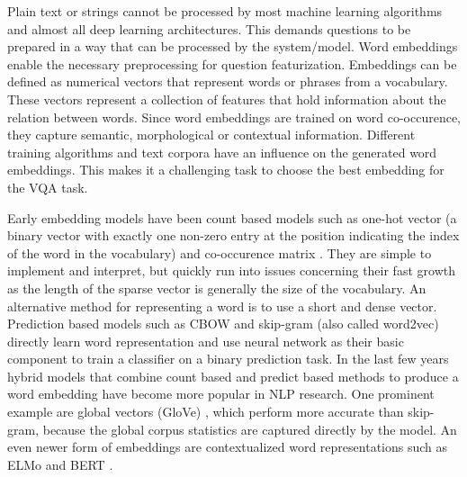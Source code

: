\documentclass{article}
\begin{document}
Plain text or strings cannot be processed by most machine learning algorithms and almost all deep learning architectures. This demands questions to be prepared in a way that can be processed by the system/model. Word embeddings enable the necessary preprocessing for question featurization. Embeddings can be defined as numerical vectors that represent words or phrases from a vocabulary. These vectors represent a collection of features that hold information about the relation between words. Since word embeddings are trained on word co-occurence, they capture semantic, morphological or contextual information. Different training algorithms and text corpora have an influence on the generated word embeddings. This makes it a challenging task to choose the best embedding for the VQA task.

Early embedding models have been count based models such as one-hot vector (a binary vector with exactly one non-zero entry at the position indicating the index of the word in the vocabulary) and co-occurence matrix \citep{miller1991contextual}. They are simple to implement and interpret, but quickly run into issues concerning their fast growth as the length of the sparse vector is generally the size of the vocabulary. An alternative method for representing a word is to use a short and dense vector. Prediction based models such as CBOW and skip-gram (also called word2vec) \citep{mikolov2013efficient} directly learn word representation and use neural network as their basic component to train a classifier on a binary prediction task. In the last few years hybrid models that combine count based and predict based methods to produce a word embedding have become more popular in NLP research. One prominent example are global vectors (GloVe) \citep{pennington2014glove}, which perform more accurate than skip-gram, because the global corpus statistics are captured directly by the model. An even newer form of embeddings are contextualized word representations such as ELMo \citep{peters2018elmo} and BERT \citep{devlin-etal-2019-bert}.
\end{document}
